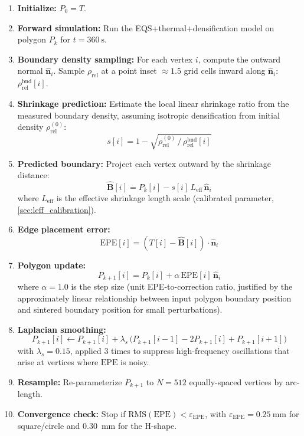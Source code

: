 \documentclass[10pt,twocolumn]{article}
\newcommand{\Leff}{L_{\mathrm{eff}}}
\newcommand{\rhorel}{\rho_{\mathrm{rel}}}
\newcommand{\EPE}{\mathrm{EPE}}
\newcommand{\vect}[1]{\boldsymbol{#1}}
\newcommand{\nhat}{\hat{\vect{n}}}
\begin{document}
\begin{enumerate}
\item \textbf{Initialize:} $P_0 = T$.
\item \textbf{Forward simulation:} Run the EQS+thermal+densification
      model on polygon $P_k$ for $t = \SI{360}{\second}$.
\item \textbf{Boundary density sampling:} For each vertex $i$, compute
      the outward normal $\nhat_i$.  Sample $\rhorel$ at a point
      inset $\approx 1.5$ grid cells inward along $\nhat_i$:
      $\rhorel^{\mathrm{bnd}}[i]$.
\item \textbf{Shrinkage prediction:} Estimate the local linear
      shrinkage ratio from the measured boundary density, assuming
      isotropic densification from initial density $\rhorel^{(0)}$:
      \begin{equation}
        s[i] = 1 - \sqrt{\rhorel^{(0)}\,/\,\rhorel^{\mathrm{bnd}}[i]}
        \label{eq:shrinkage_ratio}
      \end{equation}
\item \textbf{Predicted boundary:} Project each vertex outward by the
      shrinkage distance:
      \begin{equation}
        \hat{\vect{B}}[i] = P_k[i] - s[i]\,\Leff\,\nhat_i
        \label{eq:predicted_boundary}
      \end{equation}
      where $\Leff$ is the effective shrinkage length scale
      (calibrated parameter, \cref{sec:leff_calibration}).
\item \textbf{Edge placement error:}
      \begin{equation}
        \EPE[i] = (T[i] - \hat{\vect{B}}[i]) \cdot \nhat_i
        \label{eq:epe}
      \end{equation}
\item \textbf{Polygon update:}
      \begin{equation}
        P_{k+1}[i] = P_k[i] + \alpha\,\EPE[i]\,\nhat_i
        \label{eq:polygon_update}
      \end{equation}
      where $\alpha = 1.0$ is the step size (unit EPE-to-correction
      ratio, justified by the approximately linear relationship between
      input polygon boundary position and sintered boundary position
      for small perturbations).
\item \textbf{Laplacian smoothing:}
      \begin{equation}
        P_{k+1}[i] \leftarrow P_{k+1}[i] +
        \lambda_s\,\bigl(P_{k+1}[i-1] - 2P_{k+1}[i] + P_{k+1}[i+1]\bigr)
        \label{eq:laplacian_smooth}
      \end{equation}
      with $\lambda_s = 0.15$, applied 3 times to suppress
      high-frequency oscillations that arise at vertices where
      $\EPE$ is noisy.
\item \textbf{Resample:} Re-parameterize $P_{k+1}$ to $N = 512$
      equally-spaced vertices by arc-length.
\item \textbf{Convergence check:} Stop if
      $\mathrm{RMS}(\EPE) < \varepsilon_{\EPE}$, with
      $\varepsilon_{\EPE} = \SI{0.25}{\milli\meter}$ for square/circle
      and \SI{0.30}{\milli\meter} for the H-shape.
\end{enumerate}
\end{document}
